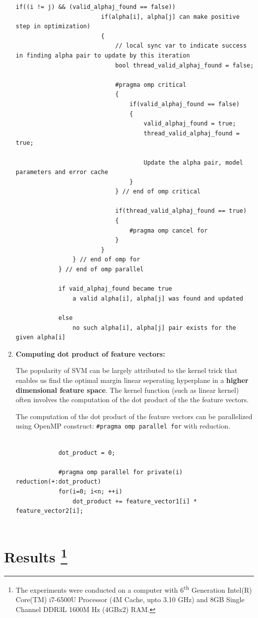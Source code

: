 \documentclass{article}
\begin{document}
\begin{enumerate}
\begin{lstlisting}[style=CStyle]
					if((i != j) && (valid_alphaj_found == false))
						if(alpha[i], alpha[j] can make positive step in optimization)
						{
							// local sync var to indicate success in finding alpha pair to update by this iteration
							bool thread_valid_alphaj_found = false;
							
							#pragma omp critical
							{							
								if(valid_alphaj_found == false)
								{
									valid_alphaj_found = true;
									thread_valid_alphaj_found = true;
									
									Update the alpha pair, model parameters and error cache
								}
							} // end of omp critical
							
							if(thread_valid_alphaj_found == true)
							{
								#pragma omp cancel for
							}
						}
				} // end of omp for
			} // end of omp parallel
			
			if vaid_alphaj_found became true
				a valid alpha[i], alpha[j] was found and updated
				
			else
				no such alpha[i], alpha[j] pair exists for the given alpha[i]
		\end{lstlisting}
		
		\item{\textbf{Computing dot product of feature vectors:}} \par
		The popularity of SVM can be largely attributed to the kernel trick that enables us find the optimal margin linear seperating hyperplane in a \textbf{higher dimensional feature space}. The kernel function (such as linear kernel) often involves the computation of the dot product of the the feature vectors.
		
		The computation of the dot product of the feature vectors can be parallelized using OpenMP construct: \lstinline[style=CStyle]{#pragma omp parallel for} with reduction.
		
		\begin{lstlisting}[style=CStyle]	
						
			dot_product = 0;
			
			#pragma omp parallel for private(i) reduction(+:dot_product)			
			for(i=0; i<n; ++i)
				dot_product += feature_vector1[i] * feature_vector2[i];
				
		\end{lstlisting}
	\end{enumerate}
	
\section{Results \protect\footnote{The experiments were conducted on a computer with 6\textsuperscript{th} Generation Intel(R) Core(TM) i7-6500U Processor (4M Cache, upto 3.10 GHz) and 8GB Single Channel DDR3L 1600M Hz (4GBx2) RAM.}}
\end{document}
